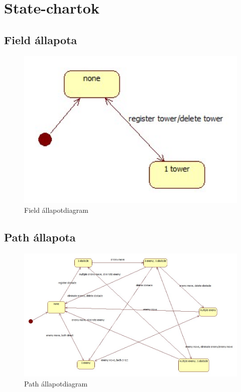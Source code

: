 \section{State-chartok}
\subsection{Field állapota}
\begin{figure}[H]
\begin{center}
\includegraphics[width=17cm]{chapters/chapter03/images/StatechartDiagram_Field.jpg}
\caption{Field állapotdiagram}
\label{fig:Field_állapotdiagram}
\end{center}
\end{figure}

\subsection{Path állapota}
\begin{figure}[H]
\begin{center}
\includegraphics[width=17cm]{chapters/chapter03/images/StatechartDiagram_Path.jpg}
\caption{Path állapotdiagram}
\label{fig:Path_állapotdiagram}
\end{center}
\end{figure}
